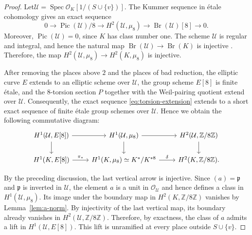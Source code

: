 \documentclass[11pt,a4paper]{amsart}
\theoremstyle{definition}
\newcommand{\Br}{\operatorname{Br}}
\newcommand{\Pic}{\operatorname{Pic}}
\numberwithin{equation}{section}
\begin{document}
\begin{proof}
	Let$
	\mathcal U
	=
	\operatorname{Spec}
	\mathcal O_K\left[1/(S\cup\{v\})\right].$
	The Kummer sequence in étale cohomology gives an exact sequence
	\[
	0\longrightarrow \Pic(\mathcal U)/8
	\longrightarrow H^2(\mathcal U,\mu_8)
	\longrightarrow \Br(\mathcal U)[8]
	\longrightarrow 0.
	\]
	Moreover, $\Pic(\mathcal U)=0$, since $K$ has class number one.
	The scheme $\mathcal U$ is regular and integral, and hence the natural
	map $
	\Br(\mathcal U)\longrightarrow \Br(K)$
	is injective \cite[Theorem 3.5.5]{CTSBr}. Therefore, the map $
	H^2(\mathcal U,\mu_8)\longrightarrow H^2(K,\mu_8)$
	is injective.
	
	After removing the places above $2$ and the places of bad reduction,
	the elliptic curve $E$ extends to an elliptic scheme over $\mathcal U$,
	the group scheme $E[8]$ is finite étale, and the $8$-torsion section
	$P$ together with the Weil-pairing quotient extend over $\mathcal U$.
	Consequently, the exact sequence
	\eqref{eq:torsion-extension} extends to a short exact sequence of finite
	étale group schemes over $\mathcal U$. Hence we obtain the following
	commutative diagram:
	\begin{equation}
		\begin{tikzcd}
			H^1(\mathcal U,E[8])\ar[r]\ar[d]
			&
			H^1(\mathcal U,\mu_8)\ar[r]\ar[d]
			&
			H^2(\mathcal U,\mathbb Z/8\mathbb Z)\ar[d]
			\\
			H^1(K,E[8])
			\ar[r,"\pi_*"]
			&
			H^1(K,\mu_8)\simeq K^*/K^{*8}
			\ar[r,"\delta"]
			&
			H^2(K,\mathbb Z/8\mathbb Z).
		\end{tikzcd}
	\end{equation}
	
	By the preceding discussion, the last vertical arrow is injective.
	Since $(a)=\mathfrak p$ and $\mathfrak p$ is inverted in $\mathcal U$,
	the element $a$ is a unit in $\mathcal O_{\mathcal U}$ and hence defines
	a class in
$	H^1(\mathcal U,\mu_8)$.
	Its image under the boundary map in
$	H^2(K,\mathbb Z/8\mathbb Z)$
	vanishes by Lemma~\ref{lem:a-norm}. By injectivity of the last vertical
	map, its boundary already vanishes in
$	H^2(\mathcal U,\mathbb Z/8\mathbb Z).$
	Therefore, by exactness, the class of $a$ admits a lift in
$	H^1(\mathcal U,E[8]).$
	This lift is unramified at every  place outside
	$S\cup\{v\}$.
\end{proof}
\end{document}

